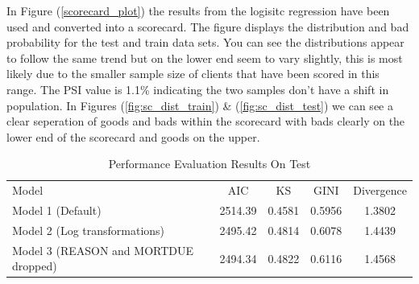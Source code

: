 In Figure (\ref{scorecard_plot}) the results from the logisitc regression have been used and converted into a scorecard. The figure displays the distribution and bad probability for the test and train data sets. You can see the distributions appear to follow the same trend but on the lower end seem to vary slightly, this is most likely due to the smaller sample size of clients that have been scored in this range. The PSI value is 1.1\% indicating the two samples don't have a shift in population. In Figures (\ref{fig:sc_dist_train}) \& (\ref{fig:sc_dist_test}) we can see a clear seperation of goods and bads within the scorecard with bads clearly on the lower end of the scorecard and goods on the upper. 

\begin{table}
\begin{center}
\renewcommand{\arraystretch}{1.25}
\begin{tabular}{lcccc}
\toprule
Model & AIC & KS & GINI & Divergence \\
Model 1 (Default) & 2514.39 & 0.4581 & 0.5956 & 1.3802  \\
Model 2 (Log transformations) & 2495.42 & 0.4814 & 0.6078 & 1.4439  \\
Model 3 (REASON and MORTDUE dropped) & 2494.34 & 0.4822 & 0.6116 & 1.4568 \\
\bottomrule
\end{tabular}
\caption{Performance Evaluation Results On Test \label{perf_eval}}
\end{center}
\end{table}

%


